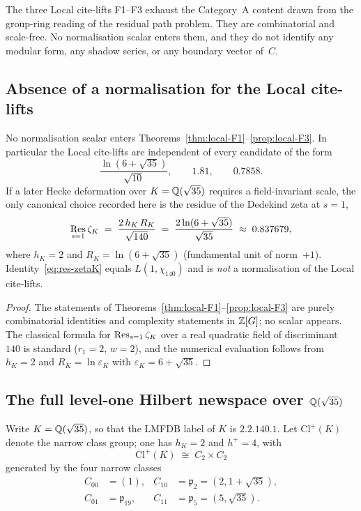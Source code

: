 \begin{remark}\label{rem:local-scope}
The three Local cite-lifts F1--F3 exhaust the Category~A content drawn from the group-ring reading of the residual path problem. They are combinatorial and scale-free. No normalisation scalar enters them, and they do not identify any modular form, any shadow series, or any boundary vector of~$C$.
\end{remark}

\subsection{Absence of a normalisation for the Local cite-lifts}
\begin{proposition}\label{prop:Lambda0-none}
No normalisation scalar enters Theorems~\ref{thm:local-F1}--\ref{prop:local-F3}. In particular the Local cite-lifts are independent of every candidate of the form
\[
\frac{\ln(6+\sqrt{35})}{\sqrt{10}},\qquad
1.81,\qquad
0.7858.
\]
If a later Hecke deformation over $K=\mathbb{Q}(\sqrt{35})$ requires a field-invariant scale, the only canonical choice recorded here is the residue of the Dedekind zeta at $s=1$,
\begin{equation}\label{eq:res-zetaK}
\operatorname*{Res}_{s=1}\zeta_K
\;=\;
\frac{2\,h_K\,R_K}{\sqrt{140}}
\;=\;
\frac{2\ln(6+\sqrt{35})}{\sqrt{35}}
\;\approx\;0.837679,
\end{equation}
where $h_K=2$ and $R_K=\ln(6+\sqrt{35})$ (fundamental unit of norm~$+1$). Identity~\eqref{eq:res-zetaK} equals $L(1,\chi_{140})$ and is \emph{not} a normalisation of the Local cite-lifts.
\end{proposition}
\begin{proof}
The statements of Theorems~\ref{thm:local-F1}--\ref{prop:local-F3} are purely combinatorial identities and complexity statements in $\mathbb{Z}[G]$; no scalar appears. The classical formula for $\operatorname*{Res}_{s=1}\zeta_K$ over a real quadratic field of discriminant~$140$ is standard ($r_1=2$, $w=2$), and the numerical evaluation follows from $h_K=2$ and $R_K=\ln\varepsilon_K$ with $\varepsilon_K=6+\sqrt{35}$.
\end{proof}

\subsection{The full level-one Hilbert newspace over $\mathbb{Q}(\sqrt{35})$}
Write $K=\mathbb{Q}(\sqrt{35})$, so that the LMFDB label of $K$ is $2.2.140.1$. Let $\mathrm{Cl}^+(K)$ denote the narrow class group; one has $h_K=2$ and $h^+=4$, with
\[
\mathrm{Cl}^+(K)\;\cong\; C_2\times C_2
\]
generated by the four narrow classes
\begin{equation}\label{eq:clplus}
\begin{aligned}
C_{00}&=(1),&
C_{10}&=\mathfrak p_2=(2,1+\sqrt{35}),\\
C_{01}&=\mathfrak p_{19},&
C_{11}&=\mathfrak p_5=(5,\sqrt{35}).
\end{aligned}
\end{equation}

